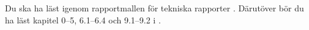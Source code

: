 Du ska ha läst igenom rapportmallen för tekniska rapporter \citep{Bosk2012etr}.
Därutöver bör du ha läst kapitel 0--5, 6.1--6.4 och 9.1--9.2 
i  \citep{Brookshear2012csa}.
